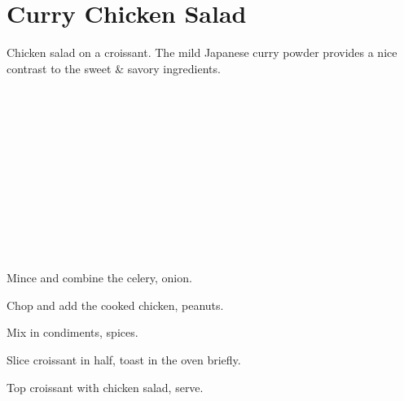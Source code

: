 \section[Chicken Salad]{Curry Chicken Salad}

\begin{recipestats}[
        servings=2,
        preptime=15~\minute,
        source=Mike \& Jane,
        original=Pamela Teresi,
    ]
\end{recipestats}

\begin{recipeabstract}
    Chicken salad on a croissant.
    The mild Japanese curry powder provides a nice contrast to the sweet \& savory ingredients.
\end{recipeabstract}

\begin{ingredientcolumns}
    \begin{ingredientblock}
        \\
        \\
        \\
        \\
        \\
    \end{ingredientblock}

    \begin{ingredientblock}
        \\
        \\
        \\
        \\
        \\
    \end{ingredientblock}
\end{ingredientcolumns}

\begin{preparation}
\item Mince and combine the celery, onion.
\item Chop and add the cooked chicken, peanuts.
\item Mix in condiments, spices.
\item Slice croissant in half, toast in the oven briefly.
\item Top croissant with chicken salad, serve.
\end{preparation}

\recipeend%
